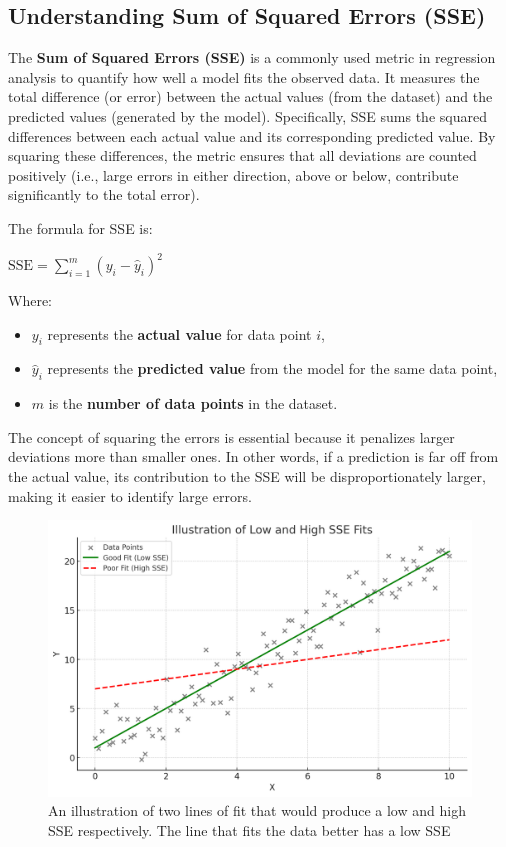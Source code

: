 \subsection{Understanding Sum of Squared Errors (SSE)}
    \large The \textbf{Sum of Squared Errors (SSE)} is a commonly used metric in regression analysis to quantify how well a model fits the observed data. It measures the total difference (or error) between the actual values (from the dataset) and the predicted values (generated by the model). Specifically, SSE sums the squared differences between each actual value and its corresponding predicted value. By squaring these differences, the metric ensures that all deviations are counted positively (i.e., large errors in either direction, above or below, contribute significantly to the total error).

    The formula for SSE is:
    \begin{center}
        \( \mathrm{SSE} = \sum_{i=1}^{m} (y_i - \hat{y}_i)^2 \)
    \end{center}
    
    Where:
    \begin{itemize}
        \item \( y_i \) represents the \textbf{actual value} for data point \( i \),
        \item \( \hat{y}_i \) represents the \textbf{predicted value} from the model for the same data point,
        \item \( m \) is the \textbf{number of data points} in the dataset.
    \end{itemize}

    The concept of squaring the errors is essential because it penalizes larger deviations more than smaller ones. In other words, if a prediction is far off from the actual value, its contribution to the SSE will be disproportionately larger, making it easier to identify large errors.

    \begin{figure}[H]
        \centering
        \includegraphics[width=0.45\linewidth]{ml/seefits.png}
        \caption{An illustration of two lines of fit that would produce a low and high SSE respectively. The line that fits the data better has a low SSE}
        \label{fig:seefits}
    \end{figure}

